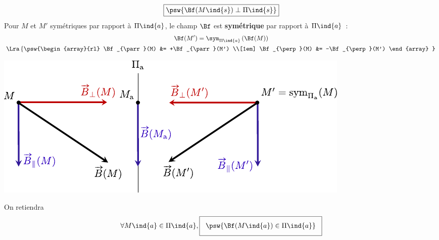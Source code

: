 \documentclass[../../main/main.tex]{subfiles}
\begin{document}
\begin{tcb*}
\begin{isd}[sidebyside align=top]
\[        \boxed{
          \psw{%
            \Bf (M\ind{s}) \perp \Pi\ind{s}
          }%
        }
    \]
    \tcblower
    Pour $M$ et $M'$ symétriques par rapport à $\Pi\ind{a}$, le champ $\Bf$ est
    \textbf{symétrique} par rapport à $\Pi\ind{a}$~:
    \begin{gather*}
      \Bf(M') = \sym_{\Pi\ind{a}} \left(\Bf(M)\right)
      \\\Lra
      \left\{ 
        \psw{%
                \begin{array}{rl}
                \Bf_{\parr}(M) &= +\Bf_{\parr}(M')
                \\[1em]
                \Bf_{\perp}(M) &= -\Bf_{\perp}(M')
              \end{array}
        }%
       \right.
    \end{gather*}
    \begin{center}
      \includegraphics[width=\linewidth]{Pasym_B}
    \end{center}
    On retiendra
    \[
		\setlength{\fboxsep}{3mm}
        \forall M\ind{a} \in \Pi\ind{a},
        \boxed{
          \psw{%
            \Bf (M\ind{a}) \in \Pi\ind{a}
          }%
        }
    \]
  \end{isd}
\end{tcb*}
\end{document}

